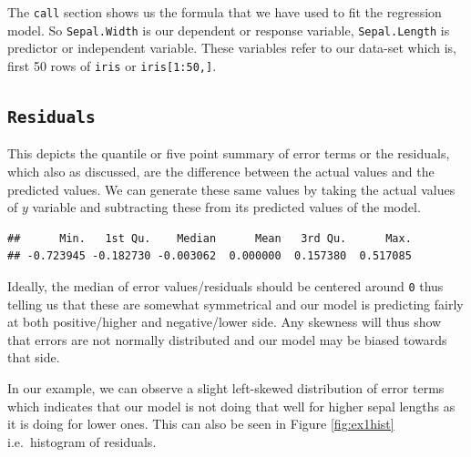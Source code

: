 \documentclass[
]{book}
\newenvironment{Shaded}{\begin{snugshade}}{\end{snugshade}}
\newcommand{\DecValTok}[1]{\textcolor[rgb]{0.00,0.00,0.81}{#1}}
\newcommand{\FunctionTok}[1]{\textcolor[rgb]{0.13,0.29,0.53}{\textbf{#1}}}
\newcommand{\NormalTok}[1]{#1}
\newcommand{\SpecialCharTok}[1]{\textcolor[rgb]{0.81,0.36,0.00}{\textbf{#1}}}
\begin{document}
The \texttt{call} section shows us the formula that we have used to fit the regression model. So \texttt{Sepal.Width} is our dependent or response variable, \texttt{Sepal.Length} is predictor or independent variable. These variables refer to our data-set which is, first 50 rows of \texttt{iris} or \texttt{iris{[}1:50,{]}}.

\hypertarget{residuals}{%
\subsection{\texorpdfstring{\texttt{Residuals}}{Residuals}}\label{residuals}}

This depicts the quantile or five point summary of error terms or the residuals, which also as discussed, are the difference between the actual values and the predicted values. We can generate these same values by taking the actual values of \(y\) variable and subtracting these from its predicted values of the model.

\begin{Shaded}
\end{Shaded}

\begin{verbatim}
##      Min.   1st Qu.    Median      Mean   3rd Qu.      Max. 
## -0.723945 -0.182730 -0.003062  0.000000  0.157380  0.517085
\end{verbatim}

Ideally, the median of error values/residuals should be centered around \texttt{0} thus telling us that these are somewhat symmetrical and our model is predicting fairly at both positive/higher and negative/lower side. Any skewness will thus show that errors are not normally distributed and our model may be biased towards that side.

In our example, we can observe a slight left-skewed distribution of error terms which indicates that our model is not doing that well for higher sepal lengths as it is doing for lower ones. This can also be seen in Figure \ref{fig:ex1hist} i.e.~histogram of residuals.
\end{document}
